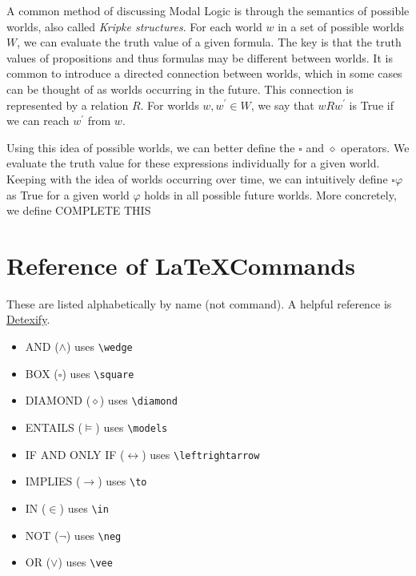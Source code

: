 \documentclass{article}
\begin{document}
A common method of discussing Modal Logic is through the semantics of possible worlds, also called \textit{Kripke structures}. For each world $w$ in a set of possible worlds $W$, we can evaluate the truth value of a given formula. The key is that the truth values of propositions and thus formulas may be different between worlds. It is common to introduce a directed connection between worlds, which in some cases can be thought of as worlds occurring in the future. This connection is represented by a relation $R$. For worlds $w, w^\prime \in W$, we say that $wRw^\prime$ is True if we can reach $w^\prime$ from $w$.

Using this idea of possible worlds, we can better define the $\square$ and $\diamond$ operators. We evaluate the truth value for these expressions individually for a given world. Keeping with the idea of worlds occurring over time, we can intuitively define $\square \varphi$ as True for a given world $\varphi$ holds in all possible future worlds. More concretely, we define COMPLETE THIS

\section{Reference of \LaTeX Commands}

These are listed alphabetically by name (not command). A helpful reference is \href{http://detexify.kirelabs.org/classify.html}{Detexify}.

\begin{itemize}
    \item AND ($\wedge$) uses \verb|\wedge|
    \item BOX ($\square$) uses \verb|\square|
    \item DIAMOND ($\diamond$) uses \verb|\diamond|
    \item ENTAILS ($\models$) uses \verb|\models|
    \item IF AND ONLY IF ($\leftrightarrow$) uses \verb|\leftrightarrow|
    \item IMPLIES ($\to$) uses \verb|\to|
    \item IN ($\in$) uses \verb|\in|
    \item NOT ($\neg$) uses \verb|\neg|
    \item OR ($\vee$) uses \verb|\vee|
\end{itemize}
\end{document}
